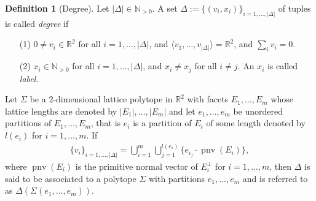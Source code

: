 \documentclass[11pt,reqno,a4]{amsart}
\theoremstyle{dotless}
\theoremstyle{definition}
\newtheorem{definition}[corollary]{Definition}
\begin{document}
\begin{definition}[Degree]\label{definition:degree}
Let $|\Delta|\in\mathbb{N}_{>0}$. A set $\Delta:=\lbrace (v_i,x_i)\rbrace_{i=1,\dots,|\Delta|}$ of tuples is called \textit{degree} if
\begin{itemize}
\item[(1)]
$0\neq v_i\in\mathbb{R}^2$ for all $i=1,\dots,|\Delta|$, and $\langle v_1,\dots,v_{|\Delta|}\rangle=\mathbb{R}^2$, and $\sum_i v_i=0$.
\item[(2)]
$x_i\in\mathbb{N}_{>0}$ for all $i=1,\dots,|\Delta|$, and $x_i\neq x_j$ for all $i\neq j$. An $x_i$ is called \textit{label}.
\end{itemize}
Let $\Sigma$ be a $2$-dimensional lattice polytope in $\mathbb{R}^2$ with facets $E_1,\dots,E_m$ whose lattice lengths are denoted by $|E_1|,\dots,|E_m|$ and let $e_1,\dots,e_m$ be unordered partitions of $E_1,\dots,E_m$, that is $e_i$ is a partition of $E_i$ of some length denoted by $l(e_i)$ for $i=1,\dots,m$. If
\begin{align*}
\lbrace v_i \rbrace_{i=1,\dots,|\Delta|}=\bigcup_{i=1}^{m}\bigcup_{j=1}^{l(e_i)}\lbrace e_{i_j}\cdot\operatorname{pnv}(E_i) \rbrace,
\end{align*}
where $\operatorname{pnv}(E_i)$ is the primitive normal vector of $E_i^\perp$ for $i=1,\dots,m$, then $\Delta$ is said to be associated to a polytope $\Sigma$ with partitions $e_1,\dots,e_m$ and is referred to as $\Delta\left( \Sigma(e_1,\dots,e_m)\right)$.


\end{definition}
\end{document}
